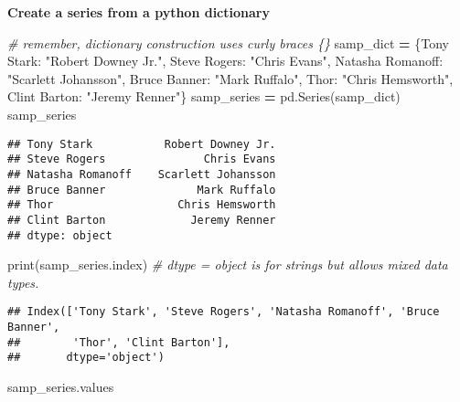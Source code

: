 \documentclass[
]{book}
\newenvironment{Shaded}{\begin{snugshade}}{\end{snugshade}}
\newcommand{\BuiltInTok}[1]{#1}
\newcommand{\CommentTok}[1]{\textcolor[rgb]{0.56,0.35,0.01}{\textit{#1}}}
\newcommand{\NormalTok}[1]{#1}
\newcommand{\OperatorTok}[1]{\textcolor[rgb]{0.81,0.36,0.00}{\textbf{#1}}}
\newcommand{\StringTok}[1]{\textcolor[rgb]{0.31,0.60,0.02}{#1}}
\begin{document}
\textbf{Create a series from a python dictionary}

\begin{Shaded}
\begin{Highlighting}[]
\CommentTok{\# remember, dictionary construction uses curly braces \{\}}
\NormalTok{samp\_dict }\OperatorTok{=}\NormalTok{ \{}\StringTok{\textquotesingle{}Tony Stark\textquotesingle{}}\NormalTok{: }\StringTok{"Robert Downey Jr."}\NormalTok{,}
             \StringTok{\textquotesingle{}Steve Rogers\textquotesingle{}}\NormalTok{: }\StringTok{"Chris Evans"}\NormalTok{,}
             \StringTok{\textquotesingle{}Natasha Romanoff\textquotesingle{}}\NormalTok{: }\StringTok{"Scarlett Johansson"}\NormalTok{,}
             \StringTok{\textquotesingle{}Bruce Banner\textquotesingle{}}\NormalTok{: }\StringTok{"Mark Ruffalo"}\NormalTok{,}
             \StringTok{\textquotesingle{}Thor\textquotesingle{}}\NormalTok{: }\StringTok{"Chris Hemsworth"}\NormalTok{,}
             \StringTok{\textquotesingle{}Clint Barton\textquotesingle{}}\NormalTok{: }\StringTok{"Jeremy Renner"}\NormalTok{\}}
\NormalTok{samp\_series }\OperatorTok{=}\NormalTok{ pd.Series(samp\_dict)}
\NormalTok{samp\_series}
\end{Highlighting}
\end{Shaded}

\begin{verbatim}
## Tony Stark           Robert Downey Jr.
## Steve Rogers               Chris Evans
## Natasha Romanoff    Scarlett Johansson
## Bruce Banner              Mark Ruffalo
## Thor                   Chris Hemsworth
## Clint Barton             Jeremy Renner
## dtype: object
\end{verbatim}

\begin{Shaded}
\begin{Highlighting}[]
\BuiltInTok{print}\NormalTok{(samp\_series.index) }\CommentTok{\# dtype = object is for strings but allows mixed data types.}
\end{Highlighting}
\end{Shaded}

\begin{verbatim}
## Index(['Tony Stark', 'Steve Rogers', 'Natasha Romanoff', 'Bruce Banner',
##        'Thor', 'Clint Barton'],
##       dtype='object')
\end{verbatim}

\begin{Shaded}
\begin{Highlighting}[]
\NormalTok{samp\_series.values}
\end{Highlighting}
\end{Shaded}
\end{document}
